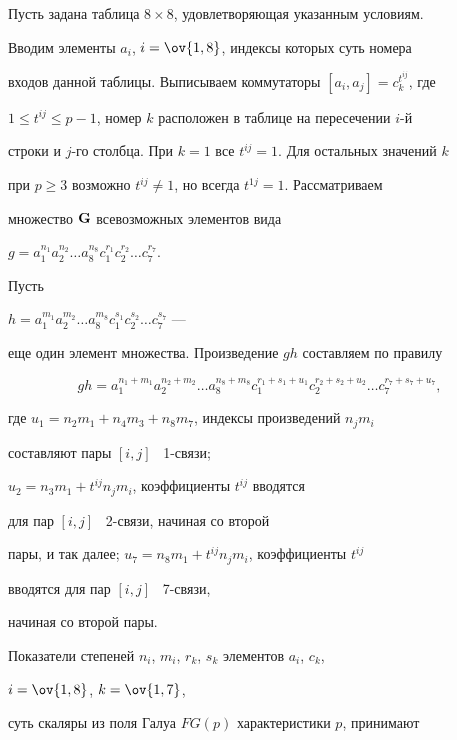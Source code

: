\begin{pf}


Пусть задана таблица $8\times 8$, удовлетворяющая указанным условиям. 


Вводим элементы $a_i$, $i=\ov{1,8}$, индексы которых суть номера


входов данной таблицы. Выписываем коммутаторы $[a_i,a_j]=c^{t^{ij}}_k$, где


$1\le t^{ij}\le p-1$, номер $k$ расположен в таблице на пересечении $i$-й


строки и $j$-го столбца. При $k=1$ все $t^{ij}=1$. Для остальных значений $k$


при $p\ge 3$ возможно $t^{ij}\ne1$, но всегда $t^{1j}=1$. Рассматриваем


множество $\bold G$ всевозможных элементов вида


$g=a^{n_1}_1a^{n_2}_2\dotsc a^{n_8}_8c^{r_1}_1c^{r_2}_2\dotsc c^{r_7}_7$.





Пусть


$h=a^{m_1}_1a^{m_2}_2\dotsc a^{m_8}_8c^{s_1}_1c^{s_2}_2\dotsc c^{s_7}_7$ ---


еще один элемент множества. Произведение $gh$ составляем по правилу


$$


gh=a^{n_1+m_1}_1a^{n_2+m_2}_2\dotsc a^{n_8+m_8}_8


c^{r_1+s_1+u_1}_1c^{r_2+s_2+u_2}_2\dotsc c^{r_7+s_7+u_7}_7,


$$


где $u_1=n_2m_1+n_4m_3+n_8m_7$, индексы произведений $n_j m_i$


составляют пары $[i,j]$ \ 1-связи;


$u_2=n_3m_1+t^{ij}n_j m_i$, коэффициенты $t^{ij}$ вводятся


для пар $[i,j]$ \ 2-связи, начиная со второй


пары, и так далее; $u_7=n_8m_1+t^{ij}n_j m_i$, коэффициенты $t^{ij}$


вводятся для пар $[i,j]$ \ 7-связи, 


начиная со второй пары.





Показатели степеней $n_i$, $m_i$, $r_k$, $s_k$ элементов $a_i$, $c_k$,


$i=\ov{1,8}$, $k=\ov{1,7}$,


суть скаляры из поля Галуа $FG(p)$ характеристики $p$, принимают



\end{pf}
